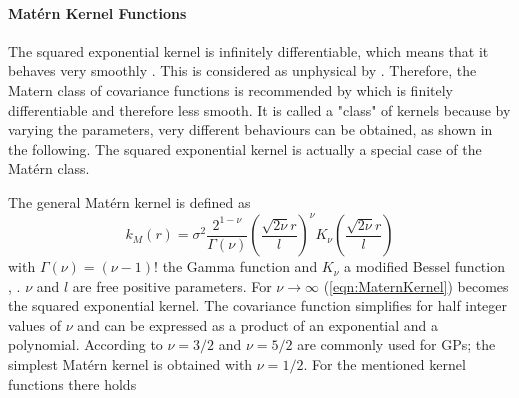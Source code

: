 \documentclass[%
  a4paper,oneside,%
  11pt,%
  smallchapters,
  style=printdev,
  extramargin,
  green,%
  rgb, <cmyk>
  ]{tubsbook}
\begin{document}
\paragraph{Mat\'ern Kernel Functions}
The squared exponential kernel is infinitely differentiable, which means that it behaves very smoothly \cite{rasmussen2006}. This is considered as unphysical by \cite{stein1999}. Therefore, the Matern class of covariance functions \cite{matern2013} is recommended by \cite{stein1999} which is finitely differentiable and therefore less smooth. It is called a "class" of kernels because by varying the parameters, very different behaviours can be obtained, as shown in the following. The squared exponential kernel is actually a special case of the Mat\'ern class.

The general Mat\'ern kernel is defined as
\begin{equation}
k_M(r) = \sigma^2 \frac{2^{1-\nu}}{\Gamma(\nu)}  \left( \frac{\sqrt{2\nu}r}{l}  \right)^{\nu} K_{\nu}  \left(  \frac{\sqrt{2\nu}r}{l}   \right)
\label{eqn:MaternKernel}
\end{equation}
with $\Gamma(\nu) = (\nu - 1)!$ the Gamma function and $K_{\nu}$ a modified Bessel function \cite[p.84 ff.]{abramowitz2013}, \cite{rasmussen2006}. $\nu$ and $l$ are free positive parameters.
For $\nu \to \infty$  (\ref{eqn:MaternKernel}) becomes the squared exponential kernel.
The covariance function simplifies for half integer values of $\nu$ and can be expressed as a product of an exponential and a polynomial. According to \cite{rasmussen2006} $\nu = 3/2$ and $\nu = 5/2$ are commonly used for GPs; the simplest Mat\'ern kernel is obtained with $\nu = 1/2$. For the mentioned kernel functions there holds
\end{document}
